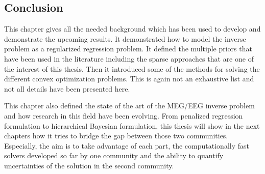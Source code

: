 \subsection{Conclusion}
This chapter gives all the needed background which has been used to develop and demonstrate the upcoming results. It demonstrated how to model the inverse problem as a regularized regression problem. It defined the multiple priors that have been used in the literature including the sparse approaches that are one of the interest of this thesis. Then it introduced some of the methods for solving the different convex optimization problems. This is again not an exhaustive list and not all details have been presented here. 

This chapter also defined the state of the art of the MEG/EEG inverse problem and how research in this field have been evolving. From penalized regression formulation to hierarchical Bayesian formulation, this thesis will show in the next chapters how it tries to bridge the gap between those two communities. Especially, the aim is to take advantage of each part, the computationally fast solvers developed so far by one community and the ability to quantify uncertainties of the solution in the second community.